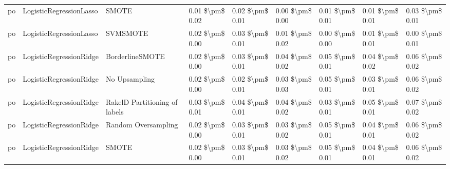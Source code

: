 \begin{tabular}{lllllllll}
      po &         LogisticRegressionLasso &                         SMOTE & 0.01 \$\textbackslash pm\$ 0.02 &           0.02 \$\textbackslash pm\$ 0.01 &       0.00 \$\textbackslash pm\$ 0.00 &        0.01 \$\textbackslash pm\$ 0.01 &                         0.01 \$\textbackslash pm\$ 0.01 &     0.03 \$\textbackslash pm\$ 0.01 \\
      po &         LogisticRegressionLasso &                      SVMSMOTE & 0.02 \$\textbackslash pm\$ 0.00 &           0.03 \$\textbackslash pm\$ 0.01 &       0.01 \$\textbackslash pm\$ 0.02 &        0.00 \$\textbackslash pm\$ 0.00 &                         0.01 \$\textbackslash pm\$ 0.01 &     0.00 \$\textbackslash pm\$ 0.01 \\
      po &         LogisticRegressionRidge &               BorderlineSMOTE & 0.02 \$\textbackslash pm\$ 0.00 &           0.03 \$\textbackslash pm\$ 0.01 &       0.04 \$\textbackslash pm\$ 0.02 &        0.05 \$\textbackslash pm\$ 0.01 &                         0.04 \$\textbackslash pm\$ 0.02 &     0.06 \$\textbackslash pm\$ 0.02 \\
      po &         LogisticRegressionRidge &                 No Upsampling & 0.02 \$\textbackslash pm\$ 0.00 &           0.02 \$\textbackslash pm\$ 0.01 &       0.03 \$\textbackslash pm\$ 0.03 &        0.05 \$\textbackslash pm\$ 0.01 &                         0.03 \$\textbackslash pm\$ 0.01 &     0.06 \$\textbackslash pm\$ 0.02 \\
      po &         LogisticRegressionRidge & RakelD Partitioning of labels & 0.03 \$\textbackslash pm\$ 0.01 &           0.04 \$\textbackslash pm\$ 0.01 &       0.04 \$\textbackslash pm\$ 0.02 &        0.03 \$\textbackslash pm\$ 0.01 &                         0.05 \$\textbackslash pm\$ 0.01 &     0.07 \$\textbackslash pm\$ 0.02 \\
      po &         LogisticRegressionRidge &           Random Oversampling & 0.02 \$\textbackslash pm\$ 0.00 &           0.03 \$\textbackslash pm\$ 0.01 &       0.03 \$\textbackslash pm\$ 0.02 &        0.05 \$\textbackslash pm\$ 0.01 &                         0.04 \$\textbackslash pm\$ 0.01 &     0.06 \$\textbackslash pm\$ 0.02 \\
      po &         LogisticRegressionRidge &                         SMOTE & 0.02 \$\textbackslash pm\$ 0.00 &           0.03 \$\textbackslash pm\$ 0.01 &       0.03 \$\textbackslash pm\$ 0.02 &        0.05 \$\textbackslash pm\$ 0.01 &                         0.04 \$\textbackslash pm\$ 0.01 &     0.06 \$\textbackslash pm\$ 0.02 \\

\end{tabular}
